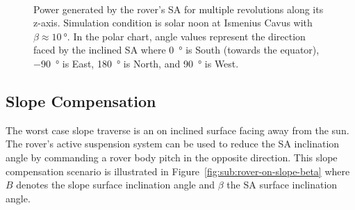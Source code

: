 \documentclass[twocolumn,letterpaper]{IEEEAerospaceCLS}  %
\newcommand{\refFig}[1]{{Figure}~\ref{#1}} %
\newlength{\subfigureWidth}
\begin{document}
\begin{figure}[h]
\begin{subfigure}[t]{\subfigureWidth}
    \label{fig:sub:simulation-data-rover-revolution-generated-power-polar-chart}
  \end{subfigure}\\[0.6ex]
  \caption{Power generated by the rover's \ac{SA} for multiple revolutions along its z-axis. Simulation condition is solar noon at Ismenius Cavus with $\beta \approx \SI{10}{\degree}$. In the polar chart, angle values represent the direction faced by the inclined \ac{SA} where \SI{0}{\degree} is South (towards the equator), \SI{-90}{\degree} is East, \SI{180}{\degree} is North, and \SI{90}{\degree} is West.}
  \label{fig:simulation-data-rover-revolution-generated-power}
\end{figure}

\subsection{Slope Compensation}

The worst case slope traverse is an on inclined surface facing away from the sun. The rover's active suspension system can be used to reduce the \ac{SA} inclination angle by commanding a rover body pitch in the opposite direction. This slope compensation scenario is illustrated in \refFig{fig:sub:rover-on-slope-beta} where $B$ denotes the slope surface inclination angle and $\beta$ the \ac{SA} surface inclination angle.
\end{document}

